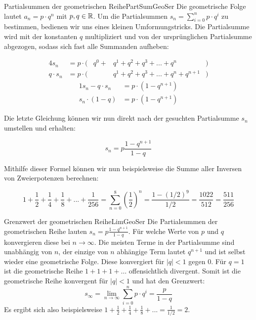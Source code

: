 \begin{example}{Partialsummen der geometrischen Reihe}{PartSumGeoSer}
	Die geometrische Folge lautet $a_n = p \cdot q^n$ mit $p,q\in\mathbb{R}$. Um die Partialsummen $s_n = \sum\limits_{i=0}^n p\cdot q^i$ zu bestimmen, bedienen wir uns eines kleinen Umformungstricks. Die Partialsumme wird mit der konstanten $q$ multipliziert und von der ursprünglichen Partialsumme abgezogen, sodass sich fast alle Summanden aufheben:

	\begin{alignat*}{4}
		        s_n       &= p \cdot ( & q^0 + & q^1 + q^2 + q^3 + ... + q^n           &) \\
		q \cdot s_n       &= p \cdot ( &       & q^1 + q^2 + q^3 + ... + q^n + q^{n+1} &)
	\end{alignat*}
	\begin{alignat*}{1}
		s_n - q \cdot s_n &= p \cdot (1 - q^{n+1}) \\
          s_n \cdot (1-q) &= p \cdot (1 - q^{n+1})
	\end{alignat*}

	Die letzte Gleichung können wir nun direkt nach der gesuchten Partialsumme $s_n$ umstellen und erhalten:

	\begin{equation}
	  s_n = p \frac{1 - q^{n+1}}{1 - q}
	\end{equation}

	Mithilfe dieser Formel können wir nun beispielsweise die Summe aller Inversen von Zweierpotenzen berechnen:

	$$
	 1 + \frac{1}{2} + \frac{1}{4} + \frac{1}{8} + ... + \frac{1}{256} = \sum\limits_{n=0}^8 (\frac{1}{2})^n = \frac{1 - (1/2)^9}{1/2} = \frac{1022}{512} = \frac{511}{256}
	$$
\end{example}

\begin{example}{Grenzwert der geometrischen Reihe}{LimGeoSer}
    Die Partialsummen der geometrischen Reihe lauten $s_n = p \frac{1 - q^{n+1}}{1 - q}$. Für welche Werte von $p$ und $q$ konvergieren diese bei $n\to\infty$. Die meisten Terme in der Partialsumme sind unabhängig von $n$, der einzige von $n$ abhängige Term lautet $q^{n+1}$ und ist selbst wieder eine geometrische Folge. Diese konvergiert für $|q| < 1$ gegen $0$. Für $q=1$ ist die geometrische Reihe $1+1+1+\dots$ offensichtlich divergent. Somit ist die geometrische Reihe konvergent für $|q|<1$ und hat den Grenzwert:
    $$
        s_\infty = \lim\limits_{n\to\infty} \sum\limits_{i=0}^n p\cdot q^i = \frac{p}{1-q}
    $$
    Es ergibt sich also beispielsweise $1 + \frac{1}{2} + \frac{1}{4} + \frac{1}{8} + ... = \frac{1}{1/2} = 2$.
\end{example}

